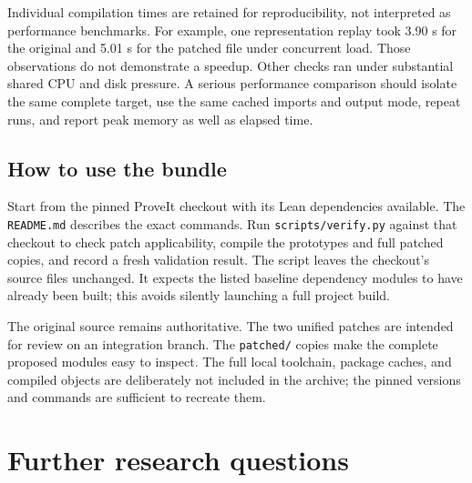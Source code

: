 \documentclass[11pt,letterpaper]{article}
\newcommand{\code}[1]{\nolinkurl{#1}}
\begin{document}
Individual compilation times are retained for reproducibility, not interpreted
as performance benchmarks. For example, one representation replay took 3.90 s
for the original and 5.01 s for the patched file under concurrent load. Those
observations do not demonstrate a speedup. Other checks ran under substantial
shared CPU and disk pressure. A serious performance comparison should isolate
the same complete target, use the same cached imports and output mode, repeat
runs, and report peak memory as well as elapsed time.

\subsection{How to use the bundle}

Start from the pinned ProveIt checkout with its Lean dependencies available.
The \code{README.md} describes the exact commands. Run
\code{scripts/verify.py} against that checkout to check patch applicability,
compile the prototypes and full patched copies, and record a fresh validation
result. The script leaves the checkout's source files unchanged. It expects
the listed baseline dependency modules to have already been built; this avoids
silently launching a full project build.

The original source remains authoritative. The two unified patches are intended
for review on an integration branch. The \code{patched/} copies make the
complete proposed modules easy to inspect. The full local toolchain, package
caches, and compiled objects are deliberately not included in the archive;
the pinned versions and commands are sufficient to recreate them.

\section{Further research questions}
\end{document}
